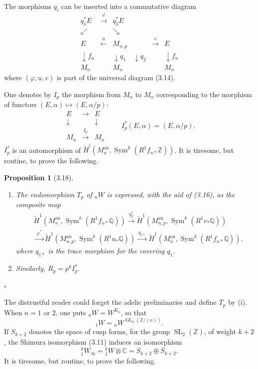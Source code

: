 \documentclass[10pt]{article}
\newcommand{\C}{\mathbb C}
\newcommand{\Q}{\mathbb Q}
\newcommand{\Z}{\mathbb Z}
\newcommand{\GL}{\operatorname{GL}}
\newcommand{\SL}{\operatorname{SL}}
\newcommand{\Sym}{\operatorname{Sym}}
\newcommand{\an}{\mathrm{an}}
\newcommand{\QED}{\hfill$\square$}
\newtheorem*{proposition}{Proposition}
\begin{document}
The morphisms $q_i$ can be inserted into a commutative diagram
\[
\begin{array}{ccccc}
q_1^*E & \xrightarrow{\ \varphi\ } & q_2^*E &&\\[-0.2em]
\swarrow && \searrow &&\\[-0.2em]
E & \xleftarrow{\ u\ } & M_{n,p} & \xrightarrow{\ v\ } & E\\[-0.2em]
\downarrow f_n && \downarrow q_1\quad\downarrow q_2 && \downarrow f_n\\[-0.2em]
M_n && M_n && M_n
\end{array}
\tag{3.16}
\]
where $(\varphi,u,v)$ is part of the universal diagram (3.14).

One denotes by $I_p$ the morphism from $M_n$ to $M_n$ corresponding to the morphism of functors $(E,\alpha)\mapsto (E,\alpha/p)$:
\[
\begin{array}{ccc}
E&\longrightarrow&E\\
\downarrow&&\downarrow\\
M_n&\xrightarrow{\ I_p\ }&M_n
\end{array}
\qquad
I_p^*(E,\alpha)=(E,\alpha/p).
\tag{3.17}
\]
$I_p^*$ is an automorphism of $\widetilde H^i(M_n^{\an},\Sym^k(R^1f_{n*}\Z))$. It is tiresome, but routine, to prove the following.

\begin{proposition}[3.18]
\leavevmode
\begin{enumerate}[label=(\roman*)]
\item The endomorphism $T_p$ of ${}_nW$ is expressed, with the aid of (3.16), as the composite map
\[
\begin{aligned}
&\widetilde H^1(M_n^{\an},\Sym^k(R^1f_{n*}\Q))
\xrightarrow{\ q_2^*\ }
\widetilde H^1(M_{n,p}^{\an},\Sym^k(R^1v_*\Q))\\
&\xrightarrow{\ \varphi^*\ }
\widetilde H^1(M_{n,p}^{\an},\Sym^k(R^1u_*\Q))
\xrightarrow{\ q_{1*}\ }
\widetilde H^1(M_n^{\an},\Sym^k(R^1f_{n*}\Q)).
\end{aligned}
\]
where $q_{1*}$ is the trace morphism for the covering $q_1$.
\item Similarly, $R_p=p^k I_p^*$.
\end{enumerate}
\end{proposition}
\QED

The distrustful reader could forget the adelic preliminaries and define $T_p$ by (i). When $n=1$ or $2$, one puts ${}_nW=W^{K_n}$, so that
\[
{}_1W={}_nW^{\GL_2(\Z/(n))}.
\]
If $S_{k+2}$ denotes the space of cusp forms, for the group $\SL_2(\Z)$, of weight $k+2$, the Shimura isomorphism (3.11) induces an isomorphism
\[
{}^k_1W_\infty={}^k_1W\otimes\C=S_{k+2}\oplus \overline{S}_{k+2}.
\]
It is tiresome, but routine, to prove the following.
\end{document}
